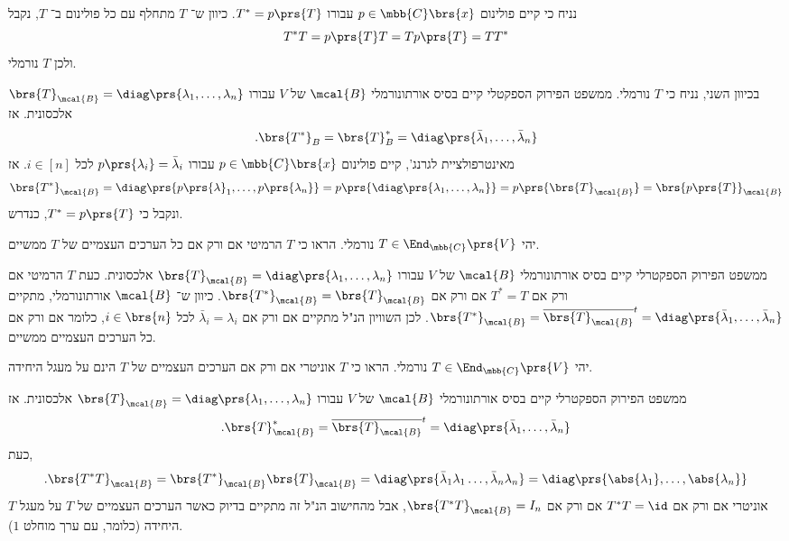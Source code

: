 \documentclass[a4paper,10pt,twoside,openany]{book}
\begin{document}
\begin{solution}
נניח כי קיים פולינום
$p \in \mbb{C}\brs{x}$
עבורו
$T^* = p\prs{T}$.
כיוון ש־%
$T$
מתחלף עם כל פולינום ב־%
$T$,
נקבל
\[T^* T = p\prs{T} T = T p\prs{T} = T T^*\]
ולכן
$T$
נורמלי.

בכיוון השני, נניח כי
$T$
נורמלי.
ממשפט הפירוק הספקטלי קיים בסיס אורתונורמלי
$\mcal{B}$
של
$V$
עבורו
$\brs{T}_\mcal{B} = \diag\prs{\lambda_1, \ldots, \lambda_n}$
אלכסונית.
אז
\[\text{.} \brs{T^*}_B = \brs{T}_B^* = \diag\prs{\bar{\lambda}_1, \ldots, \bar{\lambda}_n}\]
מאינטרפולציית לגרנג', קיים פולינום
$p \in \mbb{C}\brs{x}$
עבורו
$p\prs{\lambda_i} = \bar{\lambda}_i$
לכל
$i \in [n]$.
אז
\[\brs{T^*}_\mcal{B} = \diag\prs{p\prs{\lambda}_1, \ldots, p\prs{\lambda_n}} = p\prs{\diag\prs{\lambda_1, \ldots, \lambda_n}} = p\prs{\brs{T}_\mcal{B}} = \brs{p\prs{T}}_\mcal{B}\]
ונקבל כי
$T^* = p\prs{T}$,
כנדרש.
\end{solution}

\begin{exercisechap}
יהי
$T \in \End_{\mbb{C}}\prs{V}$
נורמלי. הראו כי
$T$
הרמיטי אם ורק אם כל הערכים העצמיים של
$T$
ממשיים.
\end{exercisechap}

\begin{solution}
ממשפט הפירוק הספקטרלי קיים בסיס אורתונורמלי
$\mcal{B}$
של
$V$
עבורו
$\brs{T}_\mcal{B} = \diag\prs{\lambda_1, \ldots, \lambda_n}$
אלכסונית.
כעת
$T$
הרמיטי אם ורק אם
$T^* = T$
אם ורק אם
$\brs{T^*}_\mcal{B} = \brs{T}_\mcal{B}$.
כיוון ש־%
$\mcal{B}$
אורתונורמלי, מתקיים
$\brs{T^*}_\mcal{B} = \overline{\brs{T}_\mcal{B}}^t = \diag\prs{\bar{\lambda}_1, \ldots, \bar{\lambda}_n}$.
לכן השוויון הנ"ל מתקיים אם ורק אם
$\bar{\lambda}_i = \lambda_i$
לכל
$i \in \brs{n}$,
כלומר אם ורק אם כל הערכים העצמיים ממשיים.
\end{solution}

\begin{exercisechap}
יהי
$T \in \End_{\mbb{C}}\prs{V}$
נורמלי. הראו כי
$T$
אוניטרי אם ורק אם
הערכים העצמיים של
$T$
הינם על מעגל היחידה.
\end{exercisechap}

\begin{solution}
ממשפט הפירוק הספקטרלי קיים בסיס אורתונורמלי
$\mcal{B}$
של
$V$
עבורו
$\brs{T}_\mcal{B} = \diag\prs{\lambda_1, \ldots, \lambda_n}$
אלכסונית.
אז
\[\text{.} \brs{T}_\mcal{B}^* = \overline{\brs{T}_\mcal{B}}^t = \diag\prs{\bar{\lambda}_1, \ldots, \bar{\lambda}_n}\]
כעת,
\[\text{.} \brs{T^* T}_\mcal{B} = \brs{T^*}_\mcal{B} \brs{T}_\mcal{B} = \diag\prs{\bar{\lambda}_1 \lambda_1 \ldots, \bar{\lambda}_n \lambda_n} = \diag\prs{\abs{\lambda_1}, \ldots, \abs{\lambda_n}}\]
$T$
אוניטרי אם ורק אם
$T^* T = \id$
אם ורק אם
$\brs{T^* T}_{\mcal{B}} = I_n$,
אבל מהחישוב הנ"ל זה מתקיים בדיוק כאשר הערכים העצמיים של
$T$
על מעגל היחידה (כלומר, עם ערך מוחלט
$1$).
\end{solution}
\end{document}
